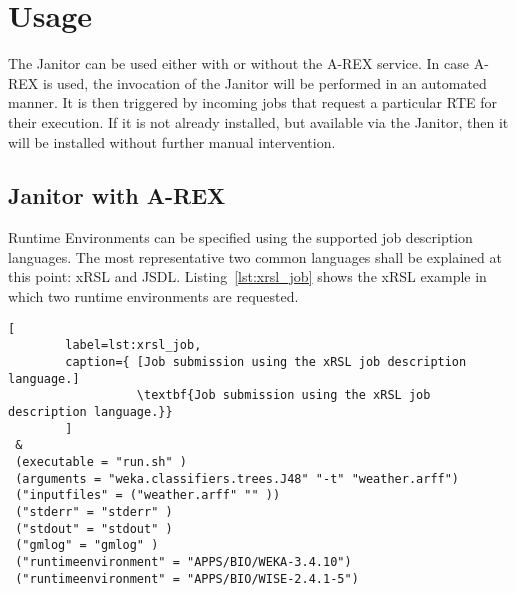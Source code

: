 \chapter{Usage}

The Janitor can be used either with or without the A-REX service.
In case A-REX is used, the invocation of the Janitor will be performed in an automated manner.
It is then triggered by incoming jobs that request a particular RTE for their execution.
If it is not already installed, but available via the Janitor, then it will be installed
without further manual intervention.

\section{Janitor with A-REX}

Runtime Environments can be specified using the supported job description languages.
The most representative two common languages shall be explained at this point: xRSL and JSDL.
Listing~\ref{lst:xrsl_job} shows the xRSL example in which two runtime environments are requested.

\begin{lstlisting}[
        label=lst:xrsl_job,
        caption={ [Job submission using the xRSL job description language.]
                  \textbf{Job submission using the xRSL job description language.}}
        ]
 &
 (executable = "run.sh" )
 (arguments = "weka.classifiers.trees.J48" "-t" "weather.arff")
 ("inputfiles" = ("weather.arff" "" ))
 ("stderr" = "stderr" )
 ("stdout" = "stdout" )
 ("gmlog" = "gmlog" )
 ("runtimeenvironment" = "APPS/BIO/WEKA-3.4.10")
 ("runtimeenvironment" = "APPS/BIO/WISE-2.4.1-5")
\end{lstlisting}

